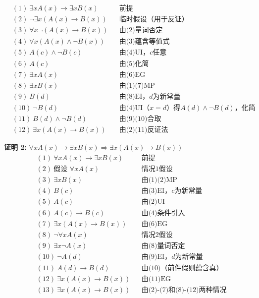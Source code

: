 \begin{align*}
&(1)\ \exists xA(x) \to \exists xB(x) && \text{前提} \\
&(2)\ \neg\exists x(A(x)\to B(x)) && \text{临时假设（用于反证）} \\
&(3)\ \forall x\neg(A(x)\to B(x)) && \text{由(2)量词否定} \\
&(4)\ \forall x(A(x) \land \neg B(x)) && \text{由(3)蕴含等值式} \\
&(5)\ A(c) \land \neg B(c) && \text{由(4)UI，$c$任意} \\
&(6)\ A(c) && \text{由(5)化简} \\
&(7)\ \exists xA(x) && \text{由(6)EG} \\
&(8)\ \exists xB(x) && \text{由(1)(7)MP} \\
&(9)\ B(d) && \text{由(8)EI，$d$为新常量} \\
&(10)\ \neg B(d) && \text{由(4)UI（$x=d$）得$A(d) \land \neg B(d)$，化简} \\
&(11)\ B(d) \land \neg B(d) && \text{由(9)(10)合取} \\
&(12)\ \exists x(A(x)\to B(x)) && \text{由(2)(11)反证法}
\end{align*}

\noindent
\textbf{证明 2:} $\forall xA(x)\to \exists xB(x)\Rightarrow \exists x(A(x)\to B(x))$
\vspace{-10pt}
\begin{align*}
&(1)\ \forall xA(x) \to \exists xB(x) && \text{前提} \\
&(2)\ \text{假设 } \forall xA(x) && \text{情况1假设} \\
&(3)\ \exists xB(x) && \text{由(1)(2)MP} \\
&(4)\ B(c) && \text{由(3)EI，$c$为新常量} \\
&(5)\ A(c) && \text{由(2)UI} \\
&(6)\ A(c) \to B(c) && \text{由(4)条件引入} \\
&(7)\ \exists x(A(x)\to B(x)) && \text{由(6)EG} \\
&(8)\ \neg\forall xA(x) && \text{情况2假设} \\
&(9)\ \exists x\neg A(x) && \text{由(8)量词否定} \\
&(10)\ \neg A(d) && \text{由(9)EI，$d$为新常量} \\
&(11)\ A(d) \to B(d) && \text{由(10)（前件假则蕴含真）} \\
&(12)\ \exists x(A(x)\to B(x)) && \text{由(11)EG} \\
&(13)\ \exists x(A(x)\to B(x)) && \text{由(2)-(7)和(8)-(12)两种情况}
\end{align*}


